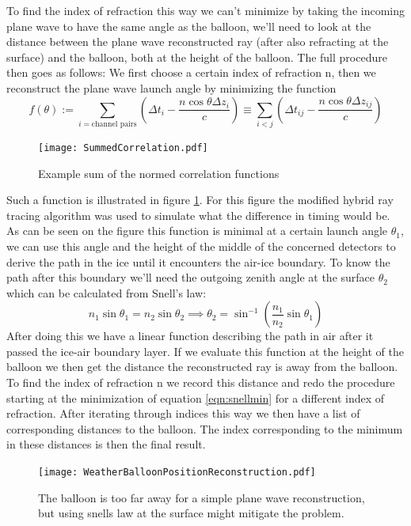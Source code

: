 To find the index of refraction this way we can't minimize by taking the
incoming plane wave to have the same angle as the balloon, we'll need to look
at the distance between the plane wave reconstructed ray (after also refracting
at the surface) and the balloon, both at the height of the balloon.  The full
procedure then goes as follows: We first choose a certain index of refraction n, 
then we reconstruct the plane wave launch angle by minimizing the function
\begin{equation}
	f(\theta) := \sum_{i=\text{channel pairs}}\left( \Delta t_i - \frac{n\cos\theta \Delta z_i}{c}\right) \equiv \sum_{i<j}\left( \Delta t_{ij} - \frac{n\cos\theta \Delta z_{ij}}{c}\right)\label{eqn:snellmin}
\end{equation}
\begin{figure}
	\centering
	\texttt{[image: SummedCorrelation.pdf]}
	\caption{Example sum of the normed correlation functions}
	\label{fig:SummedCorrelation}
\end{figure}
Such a function is illustrated in figure \ref{fig:SummedCorrelation}.  For this
figure the modified hybrid ray tracing algorithm was used to simulate what the
difference in timing would be. 
As can be seen on the figure this function is minimal at a certain launch angle
$\theta_1$, we can use this angle and the height of the middle of the concerned
detectors to derive the path in the ice until it encounters the air-ice
boundary.  To know the path after this boundary we'll need the outgoing zenith
angle at the surface $\theta_2$ which can be calculated from Snell's law:
\begin{equation}
	n_1 \sin{\theta_1} = n_2 \sin{\theta_2} \implies  \theta_2 = \sin^{-1}\left(\frac{n_1}{n_2}\sin{\theta_1}\right)
\end{equation}
After doing this we have a linear function describing the path in air after it
passed the ice-air boundary layer.  If we evaluate this function at the height
of the balloon we then get the distance the reconstructed ray is away from the
balloon.  To find the index of refraction n we record this distance and redo
the procedure starting at the minimization of equation \ref{eqn:snellmin} for a
different index of refraction. After iterating through indices this way
we then have a list of corresponding distances to the balloon. The index
corresponding to the minimum in these distances is then the final result.
\begin{figure}
	\centering
	\texttt{[image: WeatherBalloonPositionReconstruction.pdf]}
	\caption{The balloon is too far away for a simple plane wave reconstruction, but using
  snells law at the surface might mitigate the problem.}
	\label{fig:WeatherBalloonPositionReconstruction}
\end{figure}
